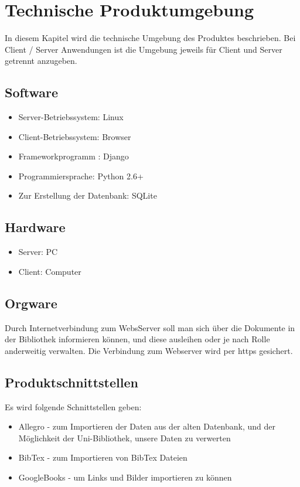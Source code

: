 
\chapter{Technische Produktumgebung}

In diesem Kapitel wird die technische Umgebung des Produktes beschrieben. Bei
Client / Server  Anwendungen ist die Umgebung jeweils für Client und Server
getrennt anzugeben.

\section{Software}
\begin{itemize}
\item Server-Betriebssystem:              Linux
\item Client-Betriebssystem:                Browser
\item Frameworkprogramm :                Django
\item Programmiersprache:                  Python 2.6+
\item Zur Erstellung der Datenbank:   SQLite
\end{itemize}



\section{Hardware}
\begin{itemize}
\item Server: PC
\item Client: Computer
\end{itemize}

\section{Orgware}

Durch Internetverbindung zum WebsServer soll man sich über die Dokumente in der Bibliothek informieren können, und 
diese ausleihen oder je nach Rolle anderweitig verwalten. Die Verbindung zum Webserver wird per https  gesichert. 



\section{Produktschnittstellen}

Es wird folgende Schnittstellen geben:
\begin{itemize}
\item Allegro - zum Importieren der Daten aus der alten Datenbank, und der Möglichkeit der Uni-Bibliothek,  unsere Daten zu verwerten
\item BibTex - zum Importieren von BibTex Dateien
\item GoogleBooks - um Links und Bilder importieren zu können
\end{itemize}


